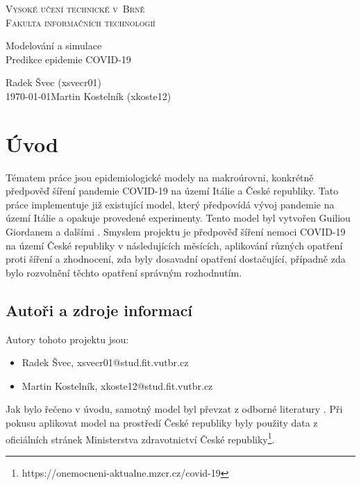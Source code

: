 \documentclass[a4paper,11pt]{article}
\begin{document}
	\begin{titlepage}
		\begin{center}
			\textsc{\Huge Vysoké učení technické v~Brně\\
				\vspace{0.4em}\huge Fakulta informačních technologií}
			
			
			{\LARGE Modelování a simulace\\
				\Huge Predikce epidemie COVID-19\\ \vspace{0.3em}}
			
			
			{\Large \hfill Radek Švec (xsvecr01)\\ \today \hfill Martin Kostelník (xkoste12)}
		\end{center}
	\end{titlepage}

	\section{Úvod}
		Tématem práce jsou epidemiologické modely na makroúrovni, konkrétně předpověď šíření pandemie COVID-19 na území Itálie a České republiky. Tato práce implementuje již existující model, který předpovídá vývoj pandemie na území Itálie a opakuje provedené experimenty. Tento model byl vytvořen Guiliou Giordanem a dalšími \cite{source}. Smyslem projektu je předpověď šíření nemoci COVID-19 na území České republiky v následujících měsících, aplikování různých opatření proti šíření a zhodnocení, zda byly dosavadní opatření dostačující, případně zda bylo rozvolnění těchto opatření správným rozhodnutím.
		
	\subsection{Autoři a zdroje informací}
		Autory tohoto projektu jsou:
		\begin{itemize}
			\item Radek Švec, xsvecr01@stud.fit.vutbr.cz
			\item Martin Kostelník, xkoste12@stud.fit.vutbr.cz
		\end{itemize}
	
	Jak bylo řečeno v úvodu, samotný model byl převzat z odborné literatury \cite{source}. Při pokusu aplikovat model na prostředí České republiky byly použity data z oficiálních stránek Ministerstva zdravotnictví České republiky\footnote{https://onemocneni-aktualne.mzcr.cz/covid-19}.
	
\end{document}
